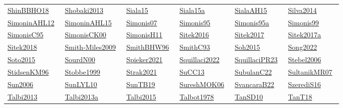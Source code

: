 \begin{longtable}{*{6}{l}}
\href{../works/ShinBBHO18.pdf}{ShinBBHO18}~\cite{ShinBBHO18} & \href{../}{Shobaki2013}~\cite{Shobaki2013} & \href{../works/Siala15.pdf}{Siala15}~\cite{Siala15} & \href{../works/Siala15a.pdf}{Siala15a}~\cite{Siala15a} & \href{../works/SialaAH15.pdf}{SialaAH15}~\cite{SialaAH15} & \href{../}{Silva2014}~\cite{Silva2014}\\ 
\href{../works/SimoninAHL12.pdf}{SimoninAHL12}~\cite{SimoninAHL12} & \href{../works/SimoninAHL15.pdf}{SimoninAHL15}~\cite{SimoninAHL15} & \href{../works/Simonis07.pdf}{Simonis07}~\cite{Simonis07} & \href{../works/Simonis95.pdf}{Simonis95}~\cite{Simonis95} & \href{../works/Simonis95a.pdf}{Simonis95a}~\cite{Simonis95a} & \href{../works/Simonis99.pdf}{Simonis99}~\cite{Simonis99}\\ 
\href{../works/SimonisC95.pdf}{SimonisC95}~\cite{SimonisC95} & \href{../works/SimonisCK00.pdf}{SimonisCK00}~\cite{SimonisCK00} & \href{../works/SimonisH11.pdf}{SimonisH11}~\cite{SimonisH11} & \href{../}{Sitek2016}~\cite{Sitek2016} & \href{../}{Sitek2017}~\cite{Sitek2017} & \href{../}{Sitek2017a}~\cite{Sitek2017a}\\ 
\href{../}{Sitek2018}~\cite{Sitek2018} & \href{../}{Smith-Miles2009}~\cite{Smith-Miles2009} & \href{../works/SmithBHW96.pdf}{SmithBHW96}~\cite{SmithBHW96} & \href{../works/SmithC93.pdf}{SmithC93}~\cite{SmithC93} & \href{../}{Soh2015}~\cite{Soh2015} & \href{../}{Song2022}~\cite{Song2022}\\ 
\href{../}{Soto2015}~\cite{Soto2015} & \href{../works/SourdN00.pdf}{SourdN00}~\cite{SourdN00} & \href{../}{Spieker2021}~\cite{Spieker2021} & \href{../}{Squillaci2022}~\cite{Squillaci2022} & \href{../works/SquillaciPR23.pdf}{SquillaciPR23}~\cite{SquillaciPR23} & \href{../}{Stebel2006}~\cite{Stebel2006}\\ 
\href{../}{StidsenKM96}~\cite{StidsenKM96} & \href{../}{Stobbe1999}~\cite{Stobbe1999} & \href{../}{Strak2021}~\cite{Strak2021} & \href{../works/SuCC13.pdf}{SuCC13}~\cite{SuCC13} & \href{../works/SubulanC22.pdf}{SubulanC22}~\cite{SubulanC22} & \href{../works/SultanikMR07.pdf}{SultanikMR07}~\cite{SultanikMR07}\\ 
\href{../}{Sun2006}~\cite{Sun2006} & \href{../works/SunLYL10.pdf}{SunLYL10}~\cite{SunLYL10} & \href{../works/SunTB19.pdf}{SunTB19}~\cite{SunTB19} & \href{../works/SureshMOK06.pdf}{SureshMOK06}~\cite{SureshMOK06} & \href{../works/SvancaraB22.pdf}{SvancaraB22}~\cite{SvancaraB22} & \href{../works/SzerediS16.pdf}{SzerediS16}~\cite{SzerediS16}\\ 
\href{../}{Talbi2013}~\cite{Talbi2013} & \href{../}{Talbi2013a}~\cite{Talbi2013a} & \href{../}{Talbi2015}~\cite{Talbi2015} & \href{../}{Talbot1978}~\cite{Talbot1978} & \href{../works/TanSD10.pdf}{TanSD10}~\cite{TanSD10} & \href{../works/TanT18.pdf}{TanT18}~\cite{TanT18}\\ 

\end{longtable}
